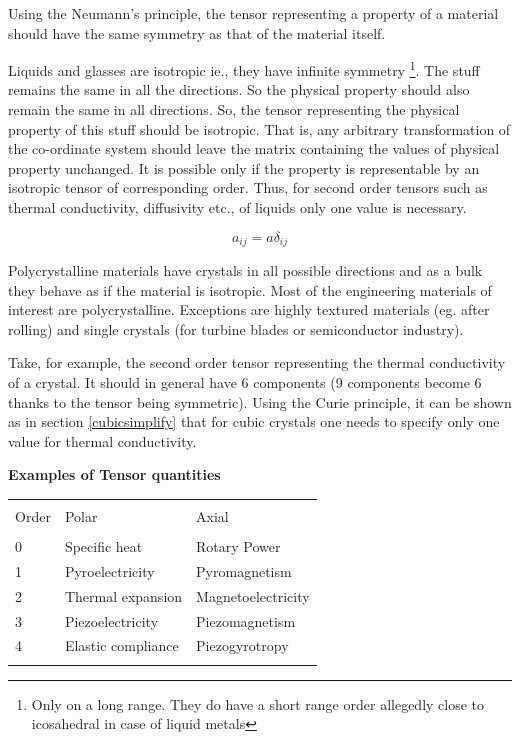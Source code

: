 Using the Neumann's principle, the tensor representing a property of a material should have the same symmetry as that of the material itself.

Liquids and glasses are isotropic ie., they have infinite symmetry \footnote{Only on a long range. They do have a short range order allegedly close to icosahedral in case of liquid metals}. The stuff remains the same in all the directions. So the physical property should also remain the same in all directions. So, the tensor representing the physical property of this stuff should be isotropic. That is, any arbitrary transformation of the co-ordinate system should leave the matrix containing the values of physical property unchanged. It is possible only if the property is representable by an isotropic tensor of corresponding order. Thus, for second order tensors such as thermal conductivity, diffusivity etc.,  of liquids only one value is necessary.

$$a_{ij} = a \delta_{ij}$$

Polycrystalline materials have crystals in all possible directions and as a bulk they behave as if the material is isotropic. Most of the engineering materials of interest are polycrystalline. Exceptions are highly textured materials (eg. after rolling) and single crystals (for turbine blades or semiconductor industry).

Take, for example, the second order tensor representing the thermal conductivity of a crystal. It should in general have 6 components (9 components become 6 thanks to the tensor being symmetric). Using the Curie principle, it can be shown as in section \ref{cubicsimplify} that for cubic crystals one needs to specify only one value for thermal conductivity.


{\bf Examples of Tensor quantities}

\begin{tabular}{lll}
\hline \\
Order & Polar & Axial \\
\hline \\
0 & Specific heat & Rotary Power \\
1 & Pyroelectricity & Pyromagnetism \\
2 & Thermal expansion & Magnetoelectricity \\
3 & Piezoelectricity & Piezomagnetism \\
4 & Elastic compliance & Piezogyrotropy \\
\hline \\
\end{tabular}


